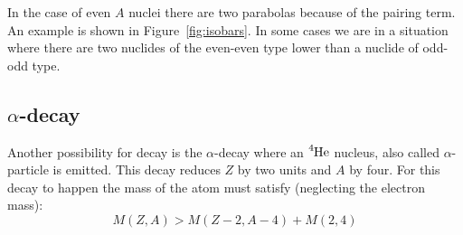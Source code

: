 \documentclass[12pt]{article}
\begin{document}
In the case of even $A$ nuclei there are two parabolas because of the pairing term. An example is shown in Figure~\ref{fig:isobars}. In some cases we are in a situation where there are two nuclides of the even-even type lower than a nuclide of odd-odd type. 
%
%
%
\subsection{$\alpha$-decay}
%
%
%
Another possibility for decay is the $\alpha$-decay where an $\ce{^4He}$ nucleus, also called $\alpha$-particle is emitted. This decay reduces $Z$ by two units and $A$ by four. For this decay to happen the mass of the atom must satisfy (neglecting the electron mass):
\[M(Z,A)> M(Z-2,A-4)+M(2,4)\]
\end{document}
